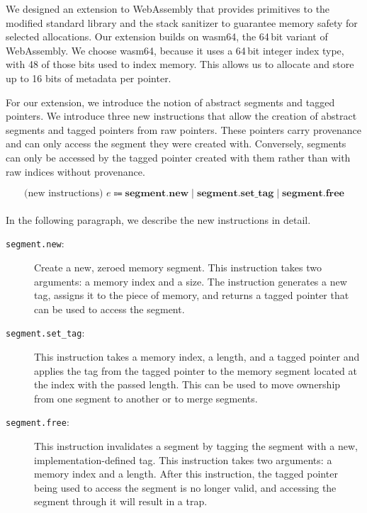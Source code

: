 We designed an extension to WebAssembly that provides primitives to the modified standard library and the stack sanitizer to guarantee memory safety for selected allocations.
Our extension builds on wasm64, the 64\,bit variant of WebAssembly.
We choose wasm64, because it uses a 64\,bit integer index type, with 48 of those bits used to index memory.
This allows us to allocate and store up to 16 bits of metadata per pointer.

For our extension, we introduce the notion of abstract segments and tagged pointers.
We introduce three new instructions that allow the creation of abstract segments and tagged pointers from raw pointers.
These pointers carry provenance and can only access the segment they were created with.
Conversely, segments can only be accessed by the tagged pointer created with them rather than with raw indices without provenance.

\begin{equation*}
    \text{(new instructions) } e \Coloneqq \textbf{segment.new} \mid \textbf{segment.set\_tag} \mid \textbf{segment.free}
\end{equation*}

\paragraph{}
In the following paragraph, we describe the new instructions in detail.

\begin{description}
    \item[\texttt{segment.new}:] Create a new, zeroed memory segment.
    This instruction takes two arguments: a memory index and a size.
    The instruction generates a new tag, assigns it to the piece of memory, and returns a tagged pointer that can be used to access the segment.
    \item[\texttt{segment.set\_tag}:] This instruction takes a memory index, a length, and a tagged pointer and applies the tag from the tagged pointer to the memory segment located at the index with the passed length.
    This can be used to move ownership from one segment to another or to merge segments.
    \item[\texttt{segment.free}:] This instruction invalidates a segment by tagging the segment with a new, implementation-defined tag.
    This instruction takes two arguments: a memory index and a length.
    After this instruction, the tagged pointer being used to access the segment is no longer valid, and accessing the segment through it will result in a trap.
\end{description}

